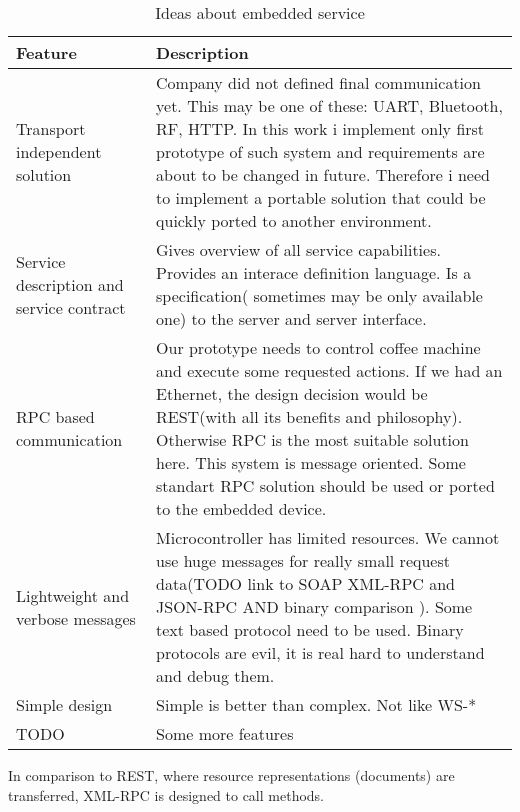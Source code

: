 \begin{table}[h]
	\centering	
	\begin{tabularx}{\textwidth}{|X|X|}
		\hline
		\textbf{Feature} & 
		\textbf{Description}  	&
	    \tabularnewline
		\hline
		Transport independent solution
		&
		Company did not defined final communication yet.
		This may be one of these: UART, Bluetooth, RF, HTTP.
		In this work i implement only first prototype of such system and 
		requirements are about to be changed in future. 
		Therefore i need to implement a portable solution that could be quickly ported
		to another environment.
		
		\tabularnewline
		\hline
			Service description and service contract &
			Gives overview of all service capabilities. \newline 
			Provides an interace definition language. \newline
			Is a specification( sometimes may be only available one) to the server and
			server interface.
	 
	    \tabularnewline
		\hline	
	    RPC based communication &
	    Our prototype needs to control coffee machine and execute some requested
	    actions. If we had an Ethernet, the design decision would be REST(with all
	    its benefits and philosophy).
	    Otherwise RPC is the most suitable solution here. This system is message
	    oriented. Some standart RPC solution should be used or ported to the
	    embedded device.
	    
	    \tabularnewline
		\hline	
		Lightweight and verbose messages &
		Microcontroller has limited resources. We cannot use huge messages for really
		small request data(TODO link to SOAP XML-RPC and JSON-RPC AND binary
		comparison ).
		Some text based protocol need to be used.
		Binary protocols are evil, it is real hard to understand and debug them.
		
	    \tabularnewline
		\hline
		Simple design &
		Simple is better than complex. \newline
		Not like WS-*
		\tabularnewline
		\hline
		TODO &
		Some more features	
		\tabularnewline
		\hline	  
	\end{tabularx} 
	\caption{Ideas about embedded service}
	\label{tbl:service_ideas}
\end{table}



 In comparison to REST, where resource
representations (documents) are transferred, XML-RPC is designed to call methods.
